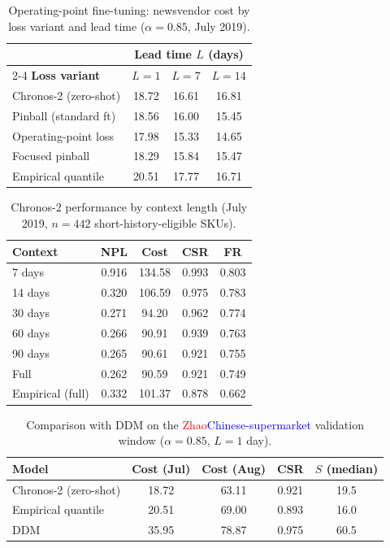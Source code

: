 \documentclass[msom,dblanonrev]{informs4}
\newcommand{\add}[1]{\textcolor{blue}{#1}}
\newcommand{\reduce}[1]{\textcolor{red}{#1}\hspace{0.5em}}
\begin{document}
\begin{table}[htbp]
\caption{Operating-point fine-tuning: newsvendor cost by loss variant and lead time ($\alpha=0.85$, July 2019).}\label{tab:oa_ws3}
\centering\small
\begin{tabular}{lccc}
\toprule
& \multicolumn{3}{c}{\textbf{Lead time $L$ (days)}} \\
\cmidrule(lr){2-4}
\textbf{Loss variant} & $L=1$ & $L=7$ & $L=14$ \\
\midrule
Chronos-2 (zero-shot) & 18.72 & 16.61 & 16.81 \\
Pinball (standard ft) & 18.56 & 16.00 & 15.45 \\
Operating-point loss  & 17.98 & 15.33 & 14.65 \\
Focused pinball       & 18.29 & 15.84 & 15.47 \\
Empirical quantile    & 20.51 & 17.77 & 16.71 \\
\bottomrule
\end{tabular}
\end{table}

\begin{table}[htbp]
\caption{Chronos-2 performance by context length (July 2019, $n=442$ short-history-eligible SKUs).}\label{tab:oa_context}
\centering\small
\begin{tabular}{lcccc}
\toprule
\textbf{Context} & \textbf{NPL} & \textbf{Cost} & \textbf{CSR} & \textbf{FR} \\
\midrule
7 days   & 0.916 & 134.58 & 0.993 & 0.803 \\
14 days  & 0.320 & 106.59 & 0.975 & 0.783 \\
30 days  & 0.271 & 94.20  & 0.962 & 0.774 \\
60 days  & 0.266 & 90.91  & 0.939 & 0.763 \\
90 days  & 0.265 & 90.61  & 0.921 & 0.755 \\
Full     & 0.262 & 90.59  & 0.921 & 0.749 \\
\midrule
Empirical (full) & 0.332 & 101.37 & 0.878 & 0.662 \\
\bottomrule
\end{tabular}
\end{table}

\begin{table}[htbp]
\caption{Comparison with DDM on the \reduce{Zhao}\add{Chinese-supermarket} validation window ($\alpha=0.85$, $L=1$ day).}\label{tab:oa_ddm}
\centering\small
\begin{tabular}{lcccc}
\toprule
\textbf{Model} & \textbf{Cost (Jul)} & \textbf{Cost (Aug)} & \textbf{CSR} & \textbf{$S$ (median)} \\
\midrule
Chronos-2 (zero-shot) & 18.72 & 63.11 & 0.921 & 19.5 \\
Empirical quantile    & 20.51 & 69.00 & 0.893 & 16.0 \\
DDM                   & 35.95 & 78.87 & 0.975 & 60.5 \\
\bottomrule
\end{tabular}
\end{table}
\end{document}
